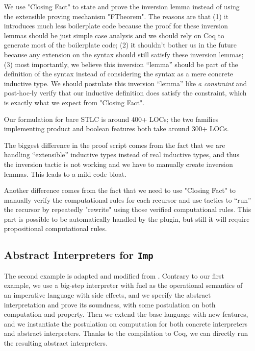 We use "Closing Fact" to state and prove the inversion lemma instead of
using the extensible proving mechanism "FTheorem". The reasons are that
(1) it introduces much less boilerplate code because the proof for these
inversion lemmas should be just simple case analysis and we should rely
on Coq to generate most of the boilerplate code; (2) it shouldn't bother us in the future
because any extension on the syntax should still satisfy these inversion
lemmas; (3) most importantly, we believe this inversion ``lemma'' should
be part of the definition of the syntax instead of considering the
syntax as a mere concrete inductive type. We should postulate this
inversion ``lemma'' like \textit{a constraint} and post-hoc-ly verify
that our inductive definition does satisfy the constraint, which is
exactly what we expect from "Closing Fact".

Our formulation for bare STLC is around 400+ LOCs; the two families implementing product and boolean features both take around 300+ LOCs. 

The biggest difference in the proof script comes from the fact that we
are handling ``extensible'' inductive types instead of real inductive
types, and thus the inversion tactic is not working and we have to manually
create inversion lemmas. This leads to a mild code bloat. 

Another difference comes from the fact that we need to use "Closing
Fact" to manually verify the computational rules for each recursor and
use tactics to ``run'' the recursor by repeatedly "rewrite" using those
verified computational rules. This part is possible to be automatically
handled by the plugin, but still it will require propositional
computational rules.

\subsection{Abstract Interpreters for \texttt{Imp}}
The second example is adapted and modified from \citet{zm2017}.
Contrary to our first example, we use a big-step interpreter with fuel
as the operational semantics of an imperative language with
side effects, and we specify the abstract interpretation and prove its
soundness, with some postulation on both computation and property.
Then we extend the base language with new features, and we instantiate
the postulation on computation for both concrete interpreters and
abstract interpreters.
Thanks to the compilation to Coq, we can directly run the resulting
abstract interpreters.

